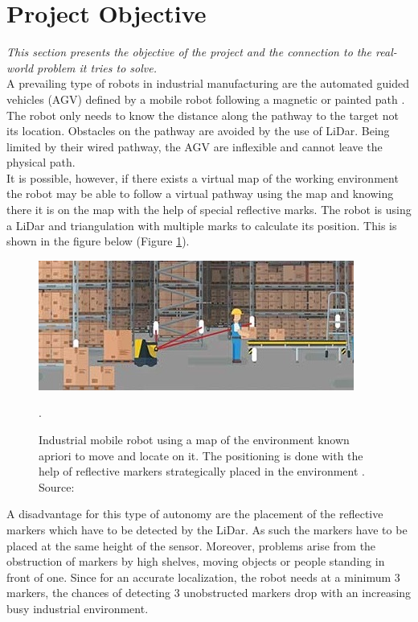 \section{Project Objective}

\textit{This section presents the objective of the project and the connection to the real-world problem it tries to solve.}\\

 A prevailing type of robots in industrial manufacturing are the automated guided vehicles (AGV) defined by a mobile robot following a magnetic or painted path \cite{agv}. The robot only needs to know the distance along the pathway to the target not its location. Obstacles on the pathway are avoided by the use of LiDar. Being limited by their wired pathway, the AGV are inflexible and cannot leave the physical path.\\
 
 It is possible, however, if there exists a virtual map of the working environment the robot may be able to follow a virtual pathway using the map and knowing there it is on the map with the help of special reflective marks. The robot is using a LiDar and triangulation with multiple marks to calculate its position. This is shown in the figure below (Figure \ref{agv}).
 
 \begin{figure}[H]
\includegraphics[scale=1.5]{Figures/agv1.jpg}
\centering
\caption{Industrial mobile robot using a map of the environment known apriori to move and locate on it. The positioning is done with the help of reflective markers strategically placed in the environment \cite{agv}. Source: \cite{agv}}.
\label{agv}
\end{figure}

A disadvantage for this type of autonomy are the placement of the reflective markers which have to be detected by the LiDar. As such the markers have to be placed at the same height of the sensor. Moreover, problems arise from the obstruction of markers by high shelves, moving objects or people standing in front of one. Since for an accurate localization, the robot needs at a minimum 3 markers, the chances of detecting 3 unobstructed markers drop with an increasing busy industrial environment.\\

